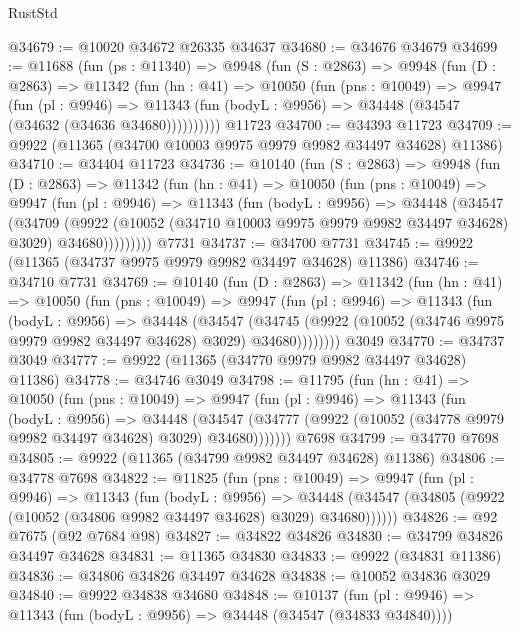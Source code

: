 \begin{lexlean}{RustStd}
\begin{coremodule}
@34679 := @10020 @34672 @26335 @34637
@34680 := @34676 @34679
@34699 := @11688
    (fun (ps : @11340) =>
    @9948
      (fun (S : @2863) =>
      @9948
        (fun (D : @2863) =>
        @11342
          (fun (hn : @41) =>
          @10050
            (fun (pns : @10049) =>
            @9947
              (fun (pl : @9946) =>
              @11343 (fun (bodyL : @9956) => @34448 (@34547 (@34632 (@34636 @34680))))))))))
    @11723
@34700 := @34393 @11723
@34709 := @9922 (@11365 (@34700 @10003 @9975 @9979 @9982 @34497 @34628) @11386)
@34710 := @34404 @11723
@34736 := @10140
    (fun (S : @2863) =>
    @9948
      (fun (D : @2863) =>
      @11342
        (fun (hn : @41) =>
        @10050
          (fun (pns : @10049) =>
          @9947
            (fun (pl : @9946) =>
            @11343
              (fun (bodyL : @9956) =>
              @34448
                (@34547
                  (@34709
                    (@9922
                      (@10052 (@34710 @10003 @9975 @9979 @9982 @34497 @34628) @3029)
                      @34680)))))))))
    @7731
@34737 := @34700 @7731
@34745 := @9922 (@11365 (@34737 @9975 @9979 @9982 @34497 @34628) @11386)
@34746 := @34710 @7731
@34769 := @10140
    (fun (D : @2863) =>
    @11342
      (fun (hn : @41) =>
      @10050
        (fun (pns : @10049) =>
        @9947
          (fun (pl : @9946) =>
          @11343
            (fun (bodyL : @9956) =>
            @34448
              (@34547
                (@34745
                  (@9922 (@10052 (@34746 @9975 @9979 @9982 @34497 @34628) @3029) @34680))))))))
    @3049
@34770 := @34737 @3049
@34777 := @9922 (@11365 (@34770 @9979 @9982 @34497 @34628) @11386)
@34778 := @34746 @3049
@34798 := @11795
    (fun (hn : @41) =>
    @10050
      (fun (pns : @10049) =>
      @9947
        (fun (pl : @9946) =>
        @11343
          (fun (bodyL : @9956) =>
          @34448
            (@34547 (@34777 (@9922 (@10052 (@34778 @9979 @9982 @34497 @34628) @3029) @34680)))))))
    @7698
@34799 := @34770 @7698
@34805 := @9922 (@11365 (@34799 @9982 @34497 @34628) @11386)
@34806 := @34778 @7698
@34822 := @11825
    (fun (pns : @10049) =>
    @9947
      (fun (pl : @9946) =>
      @11343
        (fun (bodyL : @9956) =>
        @34448 (@34547 (@34805 (@9922 (@10052 (@34806 @9982 @34497 @34628) @3029) @34680))))))
@34826 := @92 @7675 (@92 @7684 @98)
@34827 := @34822 @34826
@34830 := @34799 @34826 @34497 @34628
@34831 := @11365 @34830
@34833 := @9922 (@34831 @11386)
@34836 := @34806 @34826 @34497 @34628
@34838 := @10052 @34836 @3029
@34840 := @9922 @34838 @34680
@34848 := @10137
    (fun (pl : @9946) => @11343 (fun (bodyL : @9956) => @34448 (@34547 (@34833 @34840))))

\end{coremodule}
\end{lexlean}
